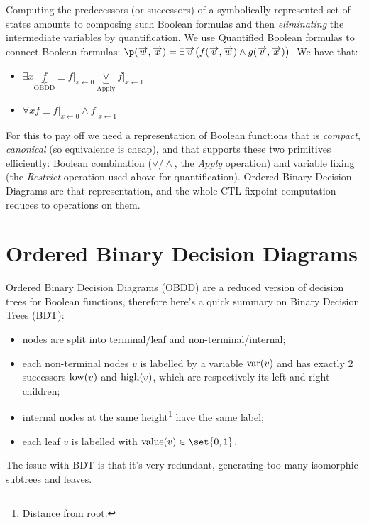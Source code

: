 \documentclass[oneside]{academica}
\begin{document}
Computing the predecessors (or successors) of a symbolically-represented set of states amounts to composing such Boolean formulas and then \emph{eliminating} the intermediate variables by quantification. We use Quantified Boolean formulas to connect Boolean formulas: $\p (\overrightarrow{w},\overrightarrow{x}) = \exists \overrightarrow{v} \big( f(\overrightarrow{v},\overrightarrow{w}) \land g(\overrightarrow{v},\overrightarrow{x}) \big)$.
We have that:
\begin{itemize}
  \item $\exists x \underbrace{f}_{\text{OBDD}} \equiv f \vert_{x \leftarrow 0} \underbrace{\lor}_{\text{Apply}} f \vert_{x \leftarrow 1}$
  \item $\forall x f \equiv f \vert_{x \leftarrow 0} \land f \vert_{x \leftarrow 1}$
\end{itemize}
For this to pay off we need a representation of Boolean functions that is \emph{compact}, \emph{canonical} (so equivalence is cheap), and that supports these two primitives efficiently: Boolean combination ($\lor / \land$, the \emph{Apply} operation) and variable fixing (the \emph{Restrict} operation used above for quantification). Ordered Binary Decision Diagrams are that representation, and the whole CTL fixpoint computation reduces to operations on them.

\section{Ordered Binary Decision Diagrams}

Ordered Binary Decision Diagrams (OBDD) are a reduced version of decision trees for Boolean functions, therefore here's a quick summary on Binary Decision Trees (BDT):
\begin{itemize}
  \item nodes are split into terminal/leaf and non-terminal/internal;
  \item each non-terminal nodes $v$ is labelled by a variable $\text{var}(v)$ and has exactly 2 successors $\text{low}(v)$ and $\text{high}(v)$, which are respectively its left and right children;
  \item internal nodes at the same height\footnote{Distance from root.} have the same label;
  \item each leaf $v$ is labelled with $\val(v) \in \set{0,1}$.
\end{itemize}
The issue with BDT is that it's very redundant, generating too many isomorphic subtrees and leaves.
\end{document}

